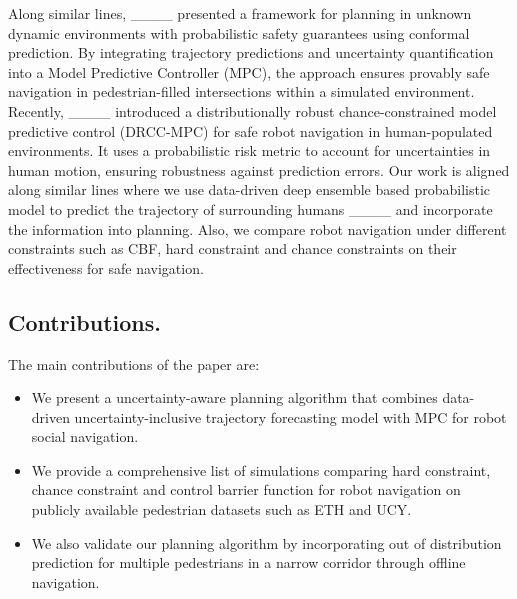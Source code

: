 Along similar lines, ____  presented a framework for planning in unknown dynamic environments with probabilistic safety guarantees using conformal prediction. By integrating trajectory predictions and uncertainty quantification into a Model Predictive Controller (MPC), the approach ensures provably safe navigation in  pedestrian-filled intersections within a simulated environment. 
Recently, ____  introduced a distributionally robust chance-constrained model predictive control (DRCC-MPC) for safe robot navigation in human-populated environments. It uses a probabilistic risk metric to account for uncertainties in human motion, ensuring robustness against prediction errors. Our work is aligned along similar lines where we use data-driven deep ensemble based probabilistic  model to predict the trajectory of  surrounding humans ____ and incorporate the information into planning. Also, we compare  robot navigation under different constraints such as CBF, hard constraint and chance constraints on their effectiveness for safe navigation.



\subsection*{\textbf{Contributions.}} The main contributions of the paper are:
\begin{itemize}
    \item   We present a uncertainty-aware planning algorithm that combines data-driven uncertainty-inclusive trajectory forecasting model with MPC for robot social navigation.

    \item We provide a comprehensive list of simulations comparing hard constraint, chance constraint and control barrier function for robot navigation on  publicly available pedestrian datasets such as ETH and UCY.

    \item We also validate our planning algorithm by incorporating out of distribution prediction for multiple pedestrians in a narrow corridor through offline navigation. 

\end{itemize}



